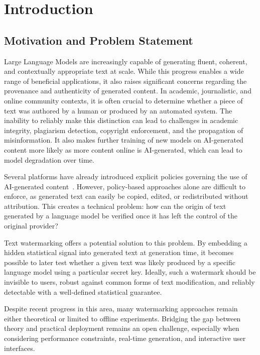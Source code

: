 \section{Introduction}

\subsection{Motivation and Problem Statement}

Large Language Models are increasingly capable of generating fluent, coherent, and contextually appropriate text at scale. While this progress enables a wide range of beneficial applications, it also raises significant concerns regarding the provenance and authenticity of generated content. In academic, journalistic, and online community contexts, it is often crucial to determine whether a piece of text was authored by a human or produced by an automated system. The inability to reliably make this distinction can lead to challenges in academic integrity, plagiarism detection, copyright enforcement, and the propagation of misinformation. It also makes further training of new models on AI-generated content more likely as more content online is AI-generated, which can lead to model degradation over time.

Several platforms have already introduced explicit policies governing the use of AI-generated content~\cite{so-gen-ai-policy}. However, policy-based approaches alone are difficult to enforce, as generated text can easily be copied, edited, or redistributed without attribution. This creates a technical problem: how can the origin of text generated by a language model be verified once it has left the control of the original provider?

Text watermarking offers a potential solution to this problem. By embedding a hidden statistical signal into generated text at generation time, it becomes possible to later test whether a given text was likely produced by a specific language model using a particular secret key. Ideally, such a watermark should be invisible to users, robust against common forms of text modification, and reliably detectable with a well-defined statistical guarantee.

Despite recent progress in this area, many watermarking approaches remain either theoretical or limited to offline experiments. Bridging the gap between theory and practical deployment remains an open challenge, especially when considering performance constraints, real-time generation, and interactive user interfaces.

